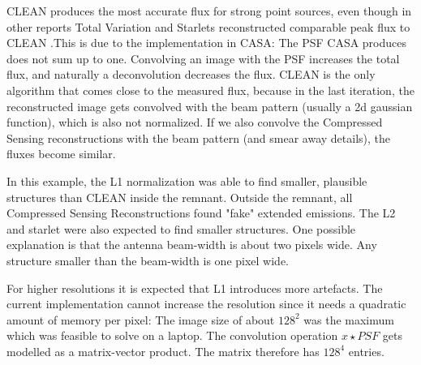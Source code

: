 CLEAN produces the most accurate flux for strong point sources, even though in other reports Total Variation and Starlets reconstructed comparable peak flux to CLEAN \cite{garsden2015lofar}\cite{mcewen2011compressed}.This is due to the implementation in CASA: The PSF CASA produces does not sum up to one. Convolving an image with the PSF increases the total flux, and naturally a deconvolution decreases the flux. CLEAN is the only algorithm that comes close to the measured flux, because in the last iteration, the reconstructed image gets convolved with the beam pattern (usually a 2d gaussian function), which is also not normalized. If we also convolve the Compressed Sensing reconstructions with the beam pattern (and smear away details), the fluxes become similar.

In this example, the L1 normalization was able to find smaller, plausible structures than CLEAN inside the remnant. Outside the remnant, all Compressed Sensing Reconstructions found "fake" extended emissions. The L2 and starlet were also expected to find smaller structures. One possible explanation is that the antenna beam-width is about two pixels wide. Any structure smaller than the beam-width is one pixel wide.

For higher resolutions it is expected that L1 introduces more artefacts. The current implementation cannot increase the resolution since it needs a quadratic amount of memory per pixel: The image size of about $128^2$ was the maximum which was feasible to solve on a laptop. The convolution operation $x \star PSF$ gets modelled as a matrix-vector product. The matrix therefore has $128^4$ entries.

